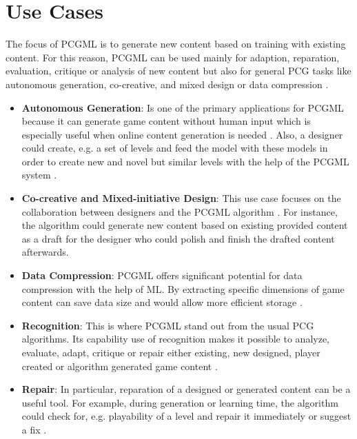 \documentclass[MGS,Master,english]{twbook}%
\begin{document}
\section{Use Cases}
The focus of PCGML is to generate new content based on training with existing content. For this reason, PCGML can be used mainly for adaption, reparation, evaluation, critique or analysis of new content but also for general PCG tasks like autonomous generation, co-creative, and mixed design or data compression \cite{pcgml::paper}.
\begin{itemize}
	\item \textbf{Autonomous Generation}: Is one of the primary applications for PCGML because it can generate game content without human input which is especially useful when online content generation is needed \cite{pcgml::paper}. Also, a designer could create, e.g. a set of levels and feed the model with these models in order to create new and novel but similar levels with the help of the PCGML system \cite{pcgml::paper}.
	\item \textbf{Co-creative and Mixed-initiative Design}: This use case focuses on the collaboration between designers and the PCGML algorithm \cite{pcgml::paper}. For instance, the algorithm could generate new content based on existing provided content as a draft for the designer who could polish and finish the drafted content afterwards.
	\item \textbf{Data Compression}: PCGML offers significant potential for data compression with the help of ML. By extracting specific dimensions of game content can save data size and would allow more efficient storage \cite{pcgml::paper}.
	\item \textbf{Recognition}: This is where PCGML stand out from the usual PCG algorithms. Its capability use of recognition makes it possible to analyze, evaluate, adapt, critique or repair either existing, new designed, player created or algorithm generated game content \cite{pcgml::paper}. 
	\item \textbf{Repair}: In particular, reparation of a designed or generated content can be a useful tool. For example, during generation or learning time, the algorithm could check for, e.g. playability of a level and repair it immediately or suggest a fix \cite{pcgml::paper}.
\end{itemize}
\end{document}
